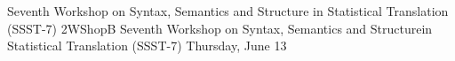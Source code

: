 \begin{wsschedule}
{Seventh Workshop on Syntax, Semantics and Structure in Statistical Translation (SSST-7)}
{2}{WShopB}
{Seventh Workshop on Syntax, Semantics and Structure\linebreak in Statistical Translation (SSST-7)}
{Thursday, June 13}{\WShopLocB}

\end{wsschedule}
